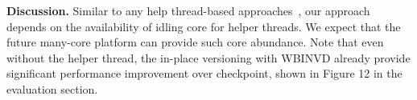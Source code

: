 \textbf{Discussion.} Similar to any help thread-based approaches~\cite{mem_reg_cf11, ipdps10:tiwari, hpca03:mutlu, tpds09:prefetching}, our approach depends on the availability of 
idling core for helper threads. We expect that the future many-core platform can provide such core abundance. Note that even without the helper thread, the in-place versioning with {\selectfont WBINVD} already provide significant performance improvement over checkpoint, shown in Figure 12 in the evaluation section.





